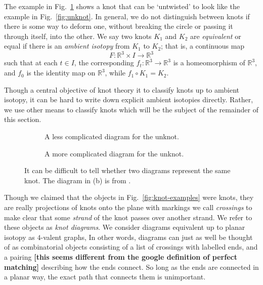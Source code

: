 \documentclass[12pt]{report}
\newcommand{\R}{\mathbb{R}}
\newcommand{\notered}[1]{{\color{Red} \textbf{#1}}}
\begin{document}
The example in Fig.~\ref{fig:unknot-twisted} shows a knot that can be `untwisted' to look like the example in Fig.~\ref{fig:unknot}. In general, we do not distinguish between knots if there is some way to deform one, without breaking the circle or passing it through itself, into the other. We say two knots $K_{1}$ and $K_{2}$ are \textit{equivalent} or equal if there is an \textit{ambient isotopy} from $K_{1}$ to $K_{2}$; that is, a continuous map
\[F: \R^{3} \times I \longrightarrow \R^{3}\]
such that at each $t \in I$, the corresponding $f_{t}: \R^{3} \longrightarrow \R^{3}$ is a homeomorphism of $\R^{3}$, and $f_{0}$ is the identity map on $\R^{3}$, while $f_{1} \circ K_{1} = K_{2}$.

Though a central objective of knot theory it to classify knots up to ambient isotopy, it can be hard to write down explicit ambient isotopies directly. Rather, we use other means to classify knots which will be the subject of the remainder of this section.

\begin{figure}[hbt]
	\centering
	\hspace*{\fill}
	\begin{subfigure}[b]{0.35 \textwidth}
		\centering
		\def\svgscale{0.2}
		
		\caption{A less complicated diagram for the unknot.}
		\label{fig:unknot-twisted}
	\end{subfigure}
	\hspace*{\fill}
	\begin{subfigure}[b]{0.35 \textwidth}
		\centering
		\def\svgscale{0.2}
		
		\caption{A more complicated diagram for the unknot.}
		\label{fig:unknot-goertiz}
	\end{subfigure}
	\hspace*{\fill}
	\caption{It can be difficult to tell whether two diagrams represent the same knot. The diagram in (b) is from \cite{notes-on-knot-theory}.}
	\label{fig:more-unknots}
\end{figure}

Though we claimed that the objects in Fig.~\ref{fig:knot-examples} were knots, they are really projections of knots onto the plane with markings we call \textit{crossings} to make clear that some \textit{strand} of the knot passes over another strand. We refer to these objects as \textit{knot diagrams}. We consider diagrams equivalent up to planar isotopy as $4$-valent graphs, In other words, diagrams can just as well be thought of as combinatorial objects consisting of a list of crossings with labelled ends, and a pairing \notered{[this seems different from the google definition of perfect matching]} describing how the ends connect. So long as the ends are connected in a planar way, the exact path that connects them is unimportant.
\end{document}
